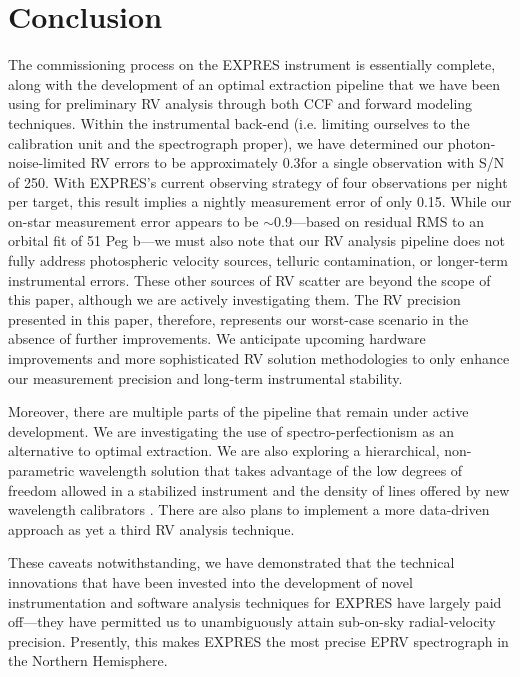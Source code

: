 \hypertarget{conclusion}{%
\section{Conclusion}\label{conclusion}}

The commissioning process on the EXPRES instrument is essentially complete, along with the development of an optimal extraction pipeline that we have been using for preliminary RV analysis through both CCF and forward modeling techniques. Within the instrumental back-end (i.e. limiting ourselves to the calibration unit and the spectrograph proper), we have determined our photon-noise-limited RV errors to be approximately 0.3\ms for a single observation with S/N of 250. With EXPRES's current observing strategy of four observations per night per target, this result implies a nightly measurement error of only 0.15\ms. While our on-star measurement error appears to be $\sim$0.9\ms---based on residual RMS to an orbital fit of 51 Peg b---we must also note that our RV analysis pipeline does not fully address photospheric velocity sources, telluric contamination, or longer-term instrumental errors. These other sources of RV scatter are beyond the scope of this paper, although we are actively investigating them. The RV precision presented in this paper, therefore, represents our worst-case scenario in the absence of further improvements. We anticipate upcoming hardware improvements and more sophisticated RV solution methodologies to only enhance our measurement precision and long-term instrumental stability. 

Moreover, there are multiple parts of the pipeline that remain under active development. We are investigating the use of spectro-perfectionism \citep{bolton_spectro-perfectionism_2009, cornachione_full_2019} as an alternative to optimal extraction. We are also exploring a hierarchical, non-parametric wavelength solution that takes advantage of the low degrees of freedom allowed in a stabilized instrument and the density of lines offered by new wavelength calibrators \citep{zhao_excalibur_2020}. There are also plans to implement a more data-driven approach \citep[as in][with modifications to permit chromatic barycentric corrections]{bedell_wobble_2019} as yet a third RV analysis technique. 

These caveats notwithstanding, we have demonstrated that the technical innovations that have been invested into the development of novel instrumentation and software analysis techniques for EXPRES have largely paid off---they have permitted us to unambiguously attain sub-\ms on-sky radial-velocity precision. Presently, this makes EXPRES the most precise EPRV spectrograph in the Northern Hemisphere.

